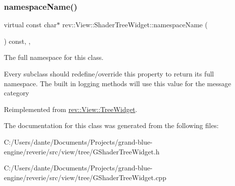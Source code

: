 \subsubsection{\texorpdfstring{namespaceName()}{namespaceName()}}
{\footnotesize\ttfamily virtual const char$\ast$ rev\+::\+View\+::\+Shader\+Tree\+Widget\+::namespace\+Name (\begin{DoxyParamCaption}{ }\end{DoxyParamCaption}) const\hspace{0.3cm}{\ttfamily [inline]}, {\ttfamily [override]}, {\ttfamily [virtual]}}



The full namespace for this class. 

Every subclass should redefine/override this property to return its full namespace. The built in logging methods will use this value for the message category 

Reimplemented from \mbox{\hyperlink{classrev_1_1_view_1_1_tree_widget_a09be824e34e50e9622c3dc333c9a3c07}{rev\+::\+View\+::\+Tree\+Widget}}.



The documentation for this class was generated from the following files\+:\begin{DoxyCompactItemize}
\item 
C\+:/\+Users/dante/\+Documents/\+Projects/grand-\/blue-\/engine/reverie/src/view/tree/G\+Shader\+Tree\+Widget.\+h\item 
C\+:/\+Users/dante/\+Documents/\+Projects/grand-\/blue-\/engine/reverie/src/view/tree/G\+Shader\+Tree\+Widget.\+cpp\end{DoxyCompactItemize}
